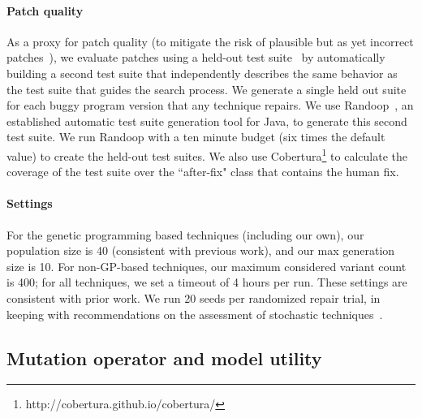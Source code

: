 \documentclass[conference]{IEEEtran}
\begin{document}
\paragraph{Patch quality}
As a proxy for patch quality (to mitigate the risk of plausible but as yet
incorrect patches~\cite{Qi15}), we evaluate patches using a held-out test
suite~\cite{legoues12Genprog,smith15} by automatically building a second test
suite that independently describes the same behavior as the test suite that
guides the search process. We generate a single held out suite for each buggy program version that any technique
repairs.  We use Randoop~\cite{pacheco07}, an established automatic
test suite generation tool for Java, to generate this second test suite. We run
Randoop with a ten minute budget (six times the default value) to create the
held-out test suites. We also use
Cobertura\footnote{http://cobertura.github.io/cobertura/} to calculate the
coverage of the test suite over the ``after-fix" class that contains the human fix.

\paragraph{Settings} For the genetic programming based techniques (including our own), our population
size is 40 (consistent with previous work), and our max generation size is 10.
For non-GP-based techniques, our maximum considered variant count is 400; for
all techniques, we set a timeout of 4 hours per run.  These settings are
consistent with prior work.  We run 20 seeds per randomized repair trial, in
keeping with recommendations on the assessment of stochastic
techniques~\cite{arcuri11}.

\subsection{Mutation operator and model utility} \label{sec:oputil}


\newcommand\mII[1]{\multicolumn{2}{c|}{#1}}
\end{document}
